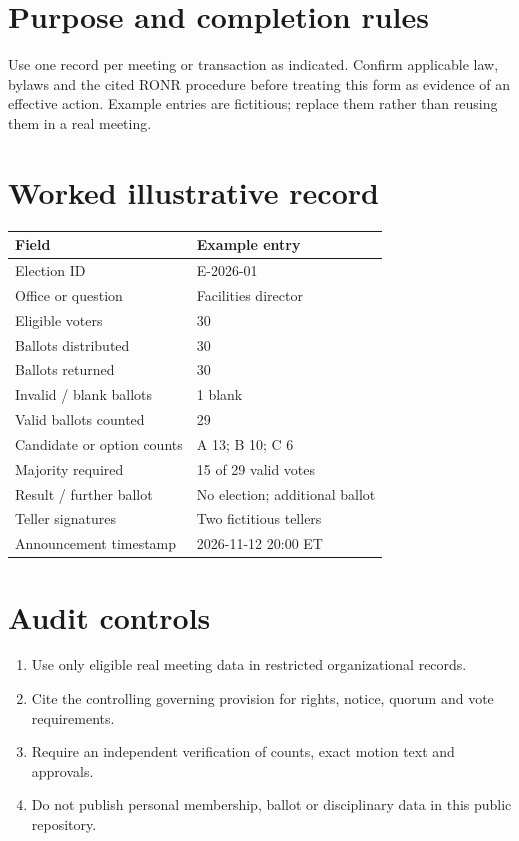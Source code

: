 \documentclass[11pt]{article}
\begin{document}
\SuiteOpen
\section{Purpose and completion rules}
Use one record per meeting or transaction as indicated. Confirm applicable law, bylaws and the cited RONR procedure before treating this form as evidence of an effective action. Example entries are fictitious; replace them rather than reusing them in a real meeting.

\section{Worked illustrative record}
\begin{longtable}{@{}p{.38\linewidth}p{.55\linewidth}@{}}\toprule Field & Example entry\\\midrule\endhead


Election ID & E-2026-01\\
Office or question & Facilities director\\
Eligible voters & 30\\
Ballots distributed & 30\\
Ballots returned & 30\\
Invalid / blank ballots & 1 blank\\
Valid ballots counted & 29\\
Candidate or option counts & A 13; B 10; C 6\\
Majority required & 15 of 29 valid votes\\
Result / further ballot & No election; additional ballot\\
Teller signatures & Two fictitious tellers\\
Announcement timestamp & 2026-11-12 20:00 ET\\
\bottomrule\end{longtable}
\section{Audit controls}
\begin{enumerate}[leftmargin=*,itemsep=4pt]
\item Use only eligible real meeting data in restricted organizational records.
\item Cite the controlling governing provision for rights, notice, quorum and vote requirements.
\item Require an independent verification of counts, exact motion text and approvals.
\item Do not publish personal membership, ballot or disciplinary data in this public repository.
\end{enumerate}
\end{document}
